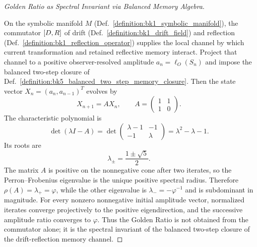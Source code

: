 \begin{proof}[Golden Ratio as Spectral Invariant via Balanced Memory Algebra]
\label{proof:bk5_golden_ratio_spectral_invariant}
\leavevmode

On the symbolic manifold $M$ (Def.~\ref{definition:bk1_symbolic_manifold}), the
commutator $[D,R]$ of drift
(Def.~\ref{definition:bk1_drift_field}) and reflection
(Def.~\ref{definition:bk1_reflection_operator}) supplies the local channel by
which current transformation and retained reflective memory interact.  Project
that channel to a positive observer-resolved amplitude $a_n=\ell_O(S_n)$ and
impose the balanced two-step closure of
Def.~\ref{definition:bk5_balanced_two_step_memory_closure}.  Then the state
vector $X_n=(a_n,a_{n-1})^T$ evolves by
\[
X_{n+1}=A X_n,\qquad
A=\begin{pmatrix}1&1\\1&0\end{pmatrix}.
\]
The characteristic polynomial is
\[
\det(\lambda I-A)
=\det\begin{pmatrix}\lambda-1&-1\\-1&\lambda\end{pmatrix}
=\lambda^2-\lambda-1.
\]
Its roots are
\[
\lambda_\pm=\frac{1\pm\sqrt{5}}{2}.
\]
The matrix $A$ is positive on the nonnegative cone after two iterates, so the
Perron--Frobenius eigenvalue is the unique positive spectral radius.  Therefore
$\rho(A)=\lambda_+=\varphi$, while the other eigenvalue is
$\lambda_-=-\varphi^{-1}$ and is subdominant in magnitude.  For every
nonzero nonnegative initial amplitude vector, normalized iterates converge
projectively to the positive eigendirection, and the successive amplitude ratio
converges to $\varphi$.  Thus the Golden Ratio is not obtained from the
commutator alone; it is the spectral invariant of the balanced two-step closure
of the drift-reflection memory channel.
\end{proof}

